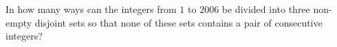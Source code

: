 \documentclass[varwidth]{standalone}
\begin{document}
    In how many ways can the integers from $1$ to $2006$ be divided into three non-empty disjoint sets so that none of these sets contains a pair of consecutive integers?
\end{document}
